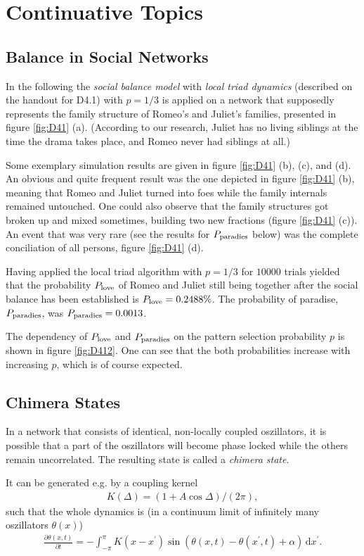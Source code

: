 \documentclass{scrartcl}
\begin{document}
\clearpage
\setcounter{section}{3}
\section{Continuative Topics}
\subsection{Balance in Social Networks}
In the following the \emph{social balance model} with \emph{local triad
dynamics} (described on the handout for D4.1) with $p = 1/3$ is applied on
a network that supposedly represents the family structure of Romeo's and
Juliet's families, presented in figure \ref{fig:D41} (a).  (According to
our research, Juliet has no living siblings at the time the drama takes
place, and Romeo never had siblings at all.)

Some exemplary simulation results are given in figure \ref{fig:D41} (b),
(c), and (d).
An obvious and quite frequent result was the one depicted in figure \ref{fig:D41}
(b), meaning that Romeo and Juliet turned into foes while the family
internals remained untouched.  One could also observe that the family
structures got broken up and mixed sometimes, building two new fractions
(figure \ref{fig:D41} (c)). An event that was very rare (see the results for
$P_{\mathrm{paradies}}$ below) was the complete conciliation of all persons,
figure \ref{fig:D41} (d).

Having applied the local triad algorithm with $p = 1/3$ for $10000$ trials
yielded that the probability $P_{\mathrm{love}}$ of Romeo and Juliet still being together after
the social balance has been established is $P_{\mathrm{love}} = 0.2488\%$.
The probability of paradise, $P_{\mathrm{paradies}}$, was $P_{\mathrm{paradies}} = 0.0013$.

The dependency of $P_{\mathrm{love}}$ and $P_{\mathrm{paradies}}$ on the pattern
selection probability $p$ is shown in figure \ref{fig:D412}. One can
see that the both probabilities increase with increasing $p$, which is
of course expected.

\subsection{Chimera States}
In a network that consists of identical, non-locally coupled oszillators, it is possible 
that a part of the oszillators will become phase locked while the others remain uncorrelated.
The resulting state is called a \emph{chimera state}.

It can be generated e.g. by a coupling kernel 
\begin{align}
K(\Delta) = (1 + A \cos{\Delta}) / (2 \pi),
\end{align}
such that the whole dynamics is (in a continuum limit of infinitely many oszillators $\theta(x)$)
\begin{align}
 \frac{\partial \theta(x, t)}{\partial t} = - \int_{-\pi}^{\pi} K(x-x^\prime) \sin \left( \theta(x, t) - \theta(x^\prime, t) + \alpha \right) \, \mathrm{d} x^\prime. \label{eq:contdyn}
\end{align}
\end{document}
